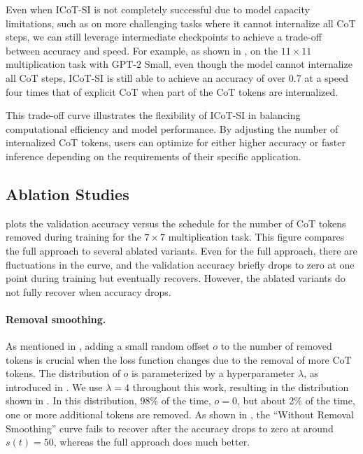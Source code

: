\documentclass{article}
\newcommand{\icotsi}{{ICoT-SI}}
\begin{document}
Even when \icotsi{} is not completely successful due to model capacity limitations, such as on more challenging tasks where it cannot internalize all CoT steps, we can still leverage intermediate checkpoints to achieve a trade-off between accuracy and speed. For example, as shown in , on the $11\times11$ multiplication task with GPT-2 Small, even though the model cannot internalize all CoT steps, \icotsi{} is still able to achieve an accuracy of over 0.7 at a speed four times that of explicit CoT when part of the CoT tokens are internalized.

This trade-off curve illustrates the flexibility of \icotsi{} in balancing computational efficiency and model performance. By adjusting the number of internalized CoT tokens, users can optimize for either higher accuracy or faster inference depending on the requirements of their specific application.

\subsection{\label{sec:ablation}Ablation Studies}
 plots the validation accuracy versus the schedule for the number of CoT tokens removed during training for the $7\times7$ multiplication task. This figure compares the full approach to several ablated variants. Even for the full approach, there are fluctuations in the curve, and the validation accuracy briefly drops to zero at one point during training but eventually recovers. However, the ablated variants do not fully recover when accuracy drops.

\paragraph{Removal smoothing.}
As mentioned in , adding a small random offset $o$ to the number of removed tokens is crucial when the loss function changes due to the removal of more CoT tokens. The distribution of $o$ is parameterized by a hyperparameter $\lambda$, as introduced in . We use $\lambda=4$ throughout this work, resulting in the distribution shown in . In this distribution, 98\% of the time, $o=0$, but about 2\% of the time, one or more additional tokens are removed. As shown in , the ``Without Removal Smoothing'' curve fails to recover after the accuracy drops to zero at around $s(t)=50$, whereas the full approach does much better.
\end{document}
